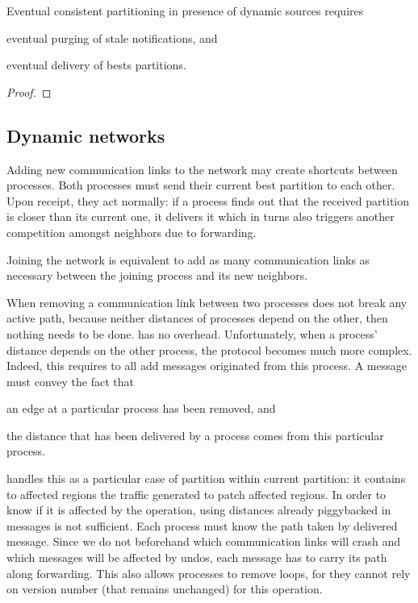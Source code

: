 \begin{theorem}
  Eventual consistent partitioning in presence of dynamic sources
  requires
  \begin{inparaenum}[(i)]
  \item eventual purging of stale notifications, and
  \item eventual delivery of bests partitions.
  \end{inparaenum}
\end{theorem}

\begin{proof}
\end{proof}



\subsection{Dynamic networks}
Adding new communication links to the network may create shortcuts
between processes. Both processes must send their current best
partition to each other. Upon receipt, they act normally: if a process
finds out that the received partition is closer than its current one,
it delivers it which in turns also triggers another competition
amongst neighbors due to forwarding.

\noindent Joining the network is equivalent to add as many
communication links as necessary between the joining process and its
new neighbors.

When removing a communication link between two processes does not
break any active path, because neither distances of processes depend
on the other, then nothing needs to be done. \NAME has no overhead.
Unfortunately, when a process' distance depends on the other process,
the protocol becomes much more complex. Indeed, this requires to
 all add messages originated from this process. A message
must convey the fact that
\begin{inparaenum}[(i)]
\item an edge at a particular process has been removed, and
\item the distance that has been delivered by a process comes from
  this particular process.
\end{inparaenum}

\noindent \NAME handles this as a particular case of partition within
current partition: it contains to affected regions the traffic
generated to patch affected regions. In order to know if it is
affected by the  operation, using distances already
piggybacked in messages is not sufficient.  Each process must know the
path taken by delivered message. Since we do not beforehand which
communication links will crash and which messages will be affected by
undos, each message has to carry its path along forwarding. This also
allows processes to remove loops, for they cannot rely on version
number (that remains unchanged) for this operation.

